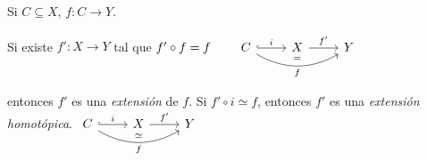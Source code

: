 \begin{tcolorbox}[colback=blue-violet!5!white,colframe=blue-violet!75!black,title=\textbf{Definición}.\index{extensión}\index{extensión homotópica}]
    Si \(C\subseteq X\), \(f\colon C\to Y\). 
    
    Si existe \(f'\colon X\to Y\) tal que \(f'\circ f=f 
    \qquad
    \begin{tikzcd}
        C \arrow[r, hookrightarrow]{}{i}
        \arrow[rr, bend right=30, swap]{}{f}
        \arrow[rr, bend right=10, draw=none, swap]{}{=}
        & X \arrow[r]{}{f'} & Y
    \end{tikzcd}\)

    entonces \(f'\) es una \textit{extensión} de \(f\).
\tcblower
    Si \(f'\circ i\simeq f\), entonces \(f'\) es una \textit{extensión homotópica}.
    \qquad
    \(\begin{tikzcd}
        C \arrow[r, hookrightarrow]{}{i}
        \arrow[rr, bend right=30, swap]{}{f}
        \arrow[rr, bend right=10, draw=none, swap]{}{\simeq}
        & X \arrow[r]{}{f'} & Y
    \end{tikzcd}\)
\end{tcolorbox}


























